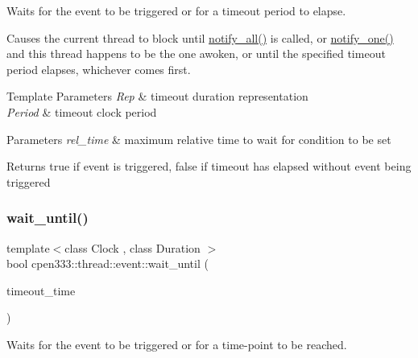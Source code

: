 Waits for the event to be triggered or for a timeout period to elapse. 

Causes the current thread to block until {\ttfamily \hyperlink{classcpen333_1_1thread_1_1event_ac41756fc84760cd537c78de31b3b25fa}{notify\+\_\+all()}} is called, or {\ttfamily \hyperlink{classcpen333_1_1thread_1_1event_a453552a68dff5c45321496e452495364}{notify\+\_\+one()}} and this thread happens to be the one awoken, or until the specified timeout period elapses, whichever comes first. 
\begin{DoxyTemplParams}{Template Parameters}
{\em Rep} & timeout duration representation \\
\hline
{\em Period} & timeout clock period \\
\hline
\end{DoxyTemplParams}

\begin{DoxyParams}{Parameters}
{\em rel\+\_\+time} & maximum relative time to wait for condition to be set \\
\hline
\end{DoxyParams}
\begin{DoxyReturn}{Returns}
{\ttfamily true} if event is triggered, {\ttfamily false} if timeout has elapsed without event being triggered 
\end{DoxyReturn}
\mbox{\label{classcpen333_1_1thread_1_1event_aeea6876ad13a451c66868849fa23ec16}} 
\subsubsection{\texorpdfstring{wait\+\_\+until()}{wait\_until()}}
{\footnotesize\ttfamily template$<$class Clock , class Duration $>$ \\
bool cpen333\+::thread\+::event\+::wait\+\_\+until (\begin{DoxyParamCaption}\item[{const std\+::chrono\+::time\+\_\+point$<$ Clock, Duration $>$ \&}]{timeout\+\_\+time }\end{DoxyParamCaption})\hspace{0.3cm}{\ttfamily [inline]}}



Waits for the event to be triggered or for a time-\/point to be reached. 

